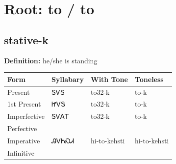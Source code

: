 \documentclass{article}%
\begin{document}
%
\normalsize%
\section*{Root: to / to}%
\subsection*{stative-k}%
\textbf{Definition: }%
he/she is standing%
\\[0.5em]%
\begin{tabular}{|l|l|l|l|}%
\hline%
\textbf{Form}&\textbf{Syllabary}&\textbf{With Tone}&\textbf{Toneless}\\%
\hline%
Present&ᎦᏙᎦ&to32{-}k&to{-}k\\%
1st Present&ᏥᏙᎦ&to32{-}k&to{-}k\\%
Imperfective&ᎦᏙᎪᎢ&to32{-}k&to{-}k\\%
Perfective&&&\\%
Imperative&ᎯᏙᎨᏍᏗ&hi{-}to{-}kehsti&hi{-}to{-}kehsti\\%
Infinitive&&&\\%
\hline%
\end{tabular}%
\\[1em]%
\end{document}
